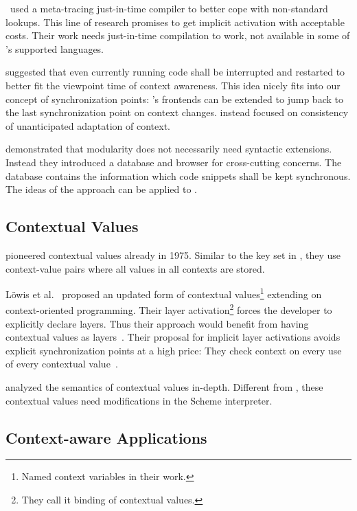 \citet{pape2016optimizing}~used a meta-tracing just-in-time compiler to better cope with non-standard lookups.
This line of research promises to get implicit activation with acceptable costs.
Their work needs just-in-time compilation to work, not available in some of \elektra{}'s supported languages.

\citet{bainomugisha2012interruptible} suggested that even currently running code shall be interrupted and restarted to better fit the viewpoint time of context awareness.
This idea nicely fits into our concept of synchronization points:
\elektra{}'s frontends can be extended to jump back to the last synchronization point on context changes.
\citet{cardozo2014validation,taing2016unanticipated} instead focused on consistency of unanticipated adaptation of context.

\citet{chiba2012we} demonstrated that modularity does not necessarily need syntactic extensions.
Instead they introduced a database and browser for cross-cutting concerns.
The database contains the information which code snippets shall be kept synchronous.
The ideas of the approach can be applied to .

\subsection{Contextual Values}

\citet{montangero1975magma,asirelli1979flexible} pioneered contextual values already in 1975.
Similar to the key set in \elektra{}, they use context-value pairs where all values in all contexts are stored.

Löwis et al.~\cite{lowis2007contextbeyond} proposed an updated form of contextual values\footnote{Named context variables in their work.} extending on context-oriented programming.
Their layer activation\footnote{They call it binding of contextual values.} forces the developer to explicitly declare layers.
Thus their approach would benefit from having contextual values as layers~\cite{lowis2007contextbeyond}.
Their proposal for implicit layer activations avoids explicit synchronization points at a high price:
They check context on every use of every contextual value~\cite{lowis2007contextbeyond}.


\citet{tanter2008contextvalues} analyzed the semantics of contextual values in-depth.
Different from \elektra{}, these contextual values need modifications in the Scheme interpreter.


\subsection{Context-aware Applications}

